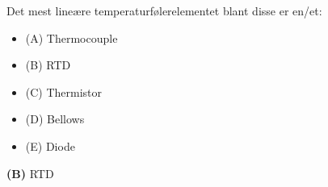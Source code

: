 

Det mest lineære temperaturfølerelementet blant disse er en/et:

\begin{itemize}
\item{(A)} Thermocouple
\vskip 5pt 
\item{(B)} RTD
\vskip 5pt 
\item{(C)} Thermistor
\vskip 5pt 
\item{(D)} Bellows
\vskip 5pt 
\item{(E)} Diode
\end{itemize}







{\bf (B)} RTD
 









